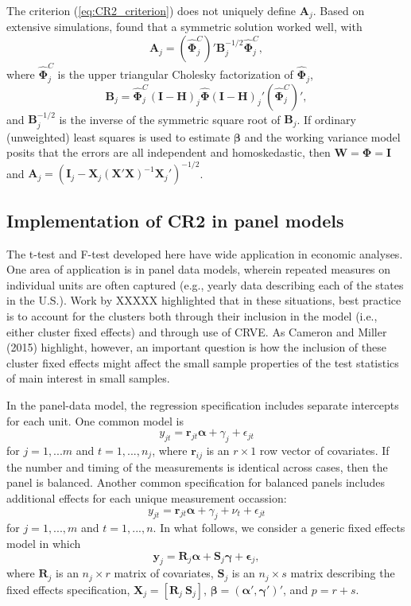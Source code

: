 \documentclass[12pt]{article}\usepackage[]{graphicx}\usepackage[]{color}
\newcommand{\bm}{\mathbf}
\newcommand{\bs}{\boldsymbol}
\begin{document}
The criterion (\ref{eq:CR2_criterion}) does not uniquely define $\bm{A}_j$. 
Based on extensive simulations, \citet{McCaffrey2001generalizations} found that a symmetric solution worked well, with 
\begin{equation}
\label{eq:CR2_adjustment}
\bm{A}_j = \left(\hat{\bs\Phi}_j^C\right)' \bm{B}_j^{-1/2}\hat{\bs\Phi}_j^C,
\end{equation}
where $\hat{\bs\Phi}_j^C$ is the upper triangular Cholesky factorization of $\hat{\bs\Phi}_j$, 
\begin{equation}
\label{eq:CR2_Bmatrix}
\bm{B}_j = \hat{\bs\Phi}_j^C\left(\bm{I} - \bm{H}\right)_j \hat{\bs\Phi} \left(\bm{I} - \bm{H}\right)_j' \left(\hat{\bs\Phi}_j^C\right)',
\end{equation}
and $\bm{B}_j^{-1/2}$ is the inverse of the symmetric square root of $\bm{B}_j $. 
If ordinary (unweighted) least squares is used to estimate $\bs\beta$ and the working variance model posits that the errors are all independent and homoskedastic, then $\bm{W} = \bs\Phi = \bm{I}$ and $\bm{A}_j = \left(\bm{I}_j - \bm{X}_j\left(\bm{X}'\bm{X}\right)^{-1}\bm{X}_j'\right)^{-1/2}$.


\subsection{Implementation of CR2 in panel models}


The t-test and F-test developed here have wide application in economic analyses. One area of application is in panel data models, wherein repeated measures on individual units are often captured (e.g., yearly data describing each of the states in the U.S.). Work by XXXXX highlighted that in these situations, best practice is to account for the clusters both through their inclusion in the model (i.e., either cluster fixed effects) and through use of CRVE. As Cameron and Miller (2015) highlight, however, an important question is how the inclusion of these cluster fixed effects might affect the small sample properties of the test statistics of main interest in small samples.

In the panel-data model, the regression specification includes separate intercepts for each unit. One common model is 
\[
y_{jt} = \bm{r}_{jt} \bs\alpha + \gamma_j + \epsilon_{jt} \]
for $j=1,...m$ and $t = 1,...,n_j$, where $\bm{r}_{ij}$ is an $r \times 1$ row vector of covariates. If the number and timing of the measurements is identical across cases, then the panel is balanced. Another common specification for balanced panels includes additional effects for each unique measurement occassion:
\[
y_{jt} = \bm{r}_{jt} \bs\alpha + \gamma_j + \nu_t + \epsilon_{jt} \]
for $j=1,...,m$ and $t = 1,...,n$. 
In what follows, we consider a generic fixed effects model in which
\begin{equation}
\label{eq:fixed_effects}
\bm{y}_j = \bm{R}_j \bs\alpha + \bm{S}_j \bs\gamma + \bs\epsilon_j,
\end{equation}
where $\bm{R}_j$ is an $n_j \times r$ matrix of covariates, $\bm{S}_j$ is an $n_j \times s$ matrix describing the fixed effects specification, $\bm{X}_j = \left[\bm{R}_j \ \bm{S}_j\right]$, $\bs\beta = \left(\bs\alpha', \bs\gamma'\right)'$, and $p = r + s$. 
\end{document}
